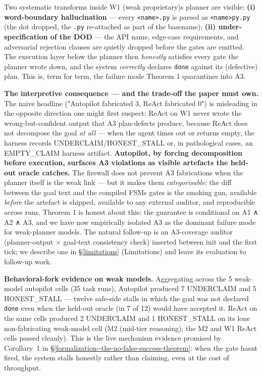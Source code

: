 Two systematic transforms inside W1 (weak proprietary)\textquotesingle s planner are visible: \textbf{(i) word-boundary
hallucination} --- every \texttt{\textless{}name\textgreater{}.py} is parsed as \texttt{\textless{}name\textgreater{}py.py} (the dot dropped, the \texttt{.py}
re-attached as part of the basename); \textbf{(ii) under-specification of the DOD} --- the API name,
edge-case requirements, and adversarial rejection clauses are quietly dropped before the gates
are emitted. The execution layer below the planner then \emph{honestly} satisfies every gate the
planner wrote down, and the system \emph{correctly} declares \texttt{done} against its (defective) plan.
This is, term for term, the failure mode Theorem 1 quarantines into A3.

\textbf{The interpretive consequence --- and the trade-off the paper must own.} The naive headline
("Autopilot fabricated 3, ReAct fabricated 0") is misleading in the opposite direction one might
first suspect: ReAct on W1 never wrote the wrong-but-confident output that A3 plan-defects
produce, because ReAct does not decompose the goal \emph{at all} --- when the agent times out or returns
empty, the harness records UNDERCLAIM/HONEST\_STALL or, in pathological cases, an EMPTY\_CLAIM
harness artifact. \textbf{Autopilot, by forcing decomposition before execution, surfaces A3 violations
as visible artefacts the held-out oracle catches.} The firewall does not prevent A3 fabrications
when the planner itself is the weak link --- but it makes them \emph{categorisable}: the diff between
the goal text and the compiled FSM\textquotesingle s gates is the smoking gun, available \emph{before} the artefact is
shipped, available to any external auditor, and reproducible across runs. Theorem 1 is honest
about this: the guarantee is conditional on A1 ∧ A2 ∧ A3, and we have now empirically isolated A3
as the dominant failure mode for weak-planner models. The natural follow-up is an A3-coverage
auditor (planner-output × goal-text consistency check) inserted between init and the first tick;
we describe one in \S\ref{limitations} (Limitations) and leave its evaluation to follow-up work.

\textbf{Behavioral-fork evidence on weak models.} Aggregating across the 5 weak-model autopilot cells
(35 task runs), Autopilot produced 7 UNDERCLAIM and 5 HONEST\_STALL --- twelve safe-side stalls in
which the goal was not declared \texttt{done} even when the held-out oracle (in 7 of 12) would have
accepted it. ReAct on the same cells produced 2 UNDERCLAIM and 1 HONEST\_STALL on its lone
non-fabricating weak-model cell (M2 (mid-tier reasoning); the M2 and W1 ReAct cells passed cleanly).
This is the live mechanism evidence promised by Corollary~1 in \S\ref{formalization--the-no-false-success-theorem}: when the gate hasn\textquotesingle t fired, the
system stalls honestly rather than claiming, even at the cost of throughput.

